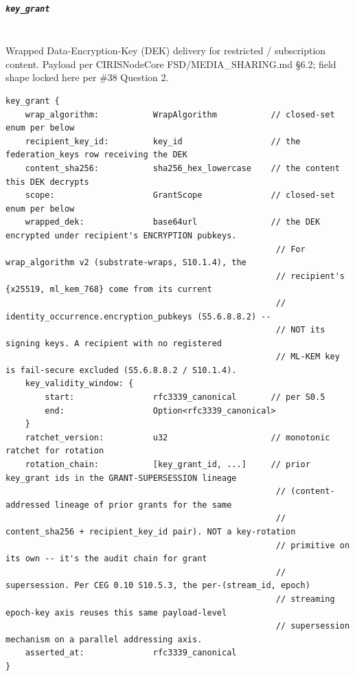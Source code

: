 \documentclass[10pt]{article}
\begin{document}
\subparagraph{\texttt{key\_grant}}\mbox{}\\


Wrapped Data-Encryption-Key (DEK) delivery for restricted / subscription content. Payload per CIRISNodeCore FSD/MEDIA\_SHARING.md §6.2; field shape locked here per \#38 Question 2.


\begin{lstlisting}
key_grant {
    wrap_algorithm:           WrapAlgorithm           // closed-set enum per below
    recipient_key_id:         key_id                  // the federation_keys row receiving the DEK
    content_sha256:           sha256_hex_lowercase    // the content this DEK decrypts
    scope:                    GrantScope              // closed-set enum per below
    wrapped_dek:              base64url               // the DEK encrypted under recipient's ENCRYPTION pubkeys.
                                                       // For wrap_algorithm v2 (substrate-wraps, S10.1.4), the
                                                       // recipient's {x25519, ml_kem_768} come from its current
                                                       // identity_occurrence.encryption_pubkeys (S5.6.8.8.2) --
                                                       // NOT its signing keys. A recipient with no registered
                                                       // ML-KEM key is fail-secure excluded (S5.6.8.8.2 / S10.1.4).
    key_validity_window: {
        start:                rfc3339_canonical       // per S0.5
        end:                  Option<rfc3339_canonical>
    }
    ratchet_version:          u32                     // monotonic ratchet for rotation
    rotation_chain:           [key_grant_id, ...]     // prior key_grant ids in the GRANT-SUPERSESSION lineage
                                                       // (content-addressed lineage of prior grants for the same
                                                       // content_sha256 + recipient_key_id pair). NOT a key-rotation
                                                       // primitive on its own -- it's the audit chain for grant
                                                       // supersession. Per CEG 0.10 S10.5.3, the per-(stream_id, epoch)
                                                       // streaming epoch-key axis reuses this same payload-level
                                                       // supersession mechanism on a parallel addressing axis.
    asserted_at:              rfc3339_canonical
}
\end{lstlisting}
\end{document}
